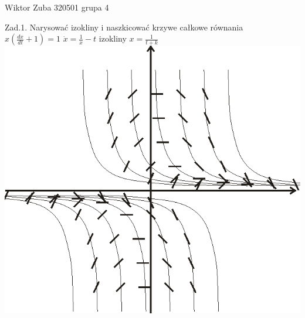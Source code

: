 \documentclass{article}
\begin{document}
Wiktor Zuba 320501 grupa 4
\newline

Zad.1.
\newline
\newline
Narysować izokliny i naszkicować krzywe całkowe równania
$
x(\frac{dx}{dt}+1)=1
$\newline
$
\dot{x}=\frac{1}{x}-t
$
izokliny
$
x=\frac{1}{t+k}
$\newline
\includegraphics[scale=0.75]{hiperbole2.png}
\newline\newline
\end{document}

